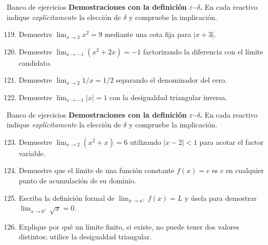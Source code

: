 \documentclass[12pt,aspectratio=169]{beamer}
\begin{document}
\begin{frame}[t,allowframebreaks]{Banco de ejercicios}
\small
\noindent \textbf{Demostraciones con la definición $\varepsilon$--$\delta$.} En cada reactivo indique \emph{explícitamente} la elección de $\delta$ y compruebe la implicación.\par\smallskip
\begin{enumerate}\setcounter{enumi}{118}
\item Demuestre $\lim_{x\to3}x^2=9$ mediante una cota fija para $|x+3|$.
\item Demuestre $\lim_{x\to-1}(x^2+2x)=-1$ factorizando la diferencia con el límite candidato.
\item Demuestre $\lim_{x\to2}1/x=1/2$ separando el denominador del cero.
\item Demuestre $\lim_{x\to-1}|x|=1$ con la desigualdad triangular inversa.
\end{enumerate}
\end{frame}


\begin{frame}[t,allowframebreaks]{Banco de ejercicios}
\small
\noindent \textbf{Demostraciones con la definición $\varepsilon$--$\delta$.} En cada reactivo indique \emph{explícitamente} la elección de $\delta$ y compruebe la implicación.\par\smallskip
\begin{enumerate}\setcounter{enumi}{122}
\item Demuestre $\lim_{x\to2}(x^2+x)=6$ utilizando $|x-2|<1$ para acotar el factor variable.
\item Demuestre que el límite de una función constante $f(x)=c$ es $c$ en cualquier punto de acumulación de su dominio.
\item Escriba la definición formal de $\lim_{x\to a^+}f(x)=L$ y úsela para demostrar $\lim_{x\to0^+}\sqrt{x}=0$.
\item Explique por qué un límite finito, si existe, no puede tener dos valores distintos; utilice la desigualdad triangular.
\end{enumerate}
\end{frame}
\end{document}
